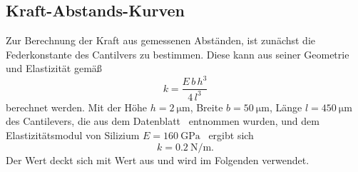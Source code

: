 \FloatBarrier
\subsection{Kraft-Abstands-Kurven}
Zur Berechnung der Kraft aus gemessenen Abständen, ist zunächst die Federkonstante des Cantilvers zu bestimmen. Diese kann
aus seiner Geometrie und Elastizität gemäß
\begin{equation}
  k = \frac{E \, b \, h^3}{4 \, l^3}
\end{equation}
berechnet werden. Mit der Höhe $h = \SI{2}{\micro\meter}$, Breite $b = \SI{50}{\micro\meter}$, Länge $l = \SI{450}{\micro\meter}$
des Cantilevers, die aus dem Datenblatt~\cite{cantilever} entnommen wurden, und dem Elastizitätsmodul von Silizium
$E = \SI{160}{\giga\pascal}$~\cite{emodulsi}
ergibt sich
\begin{equation}
  k = \SI{0.2}{\newton \per \meter}.
\end{equation}
Der Wert deckt sich mit Wert aus \cite{cantilever} und wird im Folgenden verwendet.


